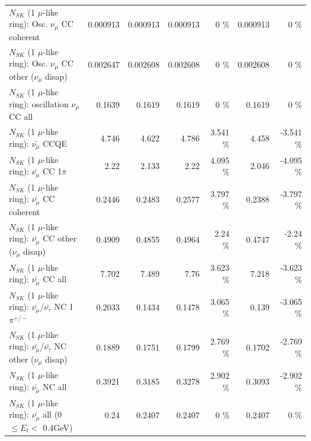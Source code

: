 \begin{table}
\begin{tabular}{| l | r | r | r  r | r  r |}
                        $N_{SK}$ (1 $\mu$-like ring): Osc. $\nu_\mu$ CC coherent &        0.000913 &        0.000913 &        0.000913 &        0 \%  &        0.000913 &        0 \%  \\ 
         $N_{SK}$ (1 $\mu$-like ring): Osc. $\nu_\mu$ CC other ($\nu_\mu$ disap) &        0.002647 &        0.002608 &        0.002608 &        0 \%  &        0.002608 &        0 \%  \\ 
                      $N_{SK}$ (1 $\mu$-like ring): oscillation $\nu_\mu$ CC all &          0.1639 &          0.1619 &          0.1619 &        0 \%  &          0.1619 &        0 \%  \\ 
\hline
\hline
                              $N_{SK}$ (1 $\mu$-like ring): $\bar{\nu_\mu}$ CCQE &           4.746 &           4.622 &           4.786 &    3.541 \%  &           4.458 &   -3.541 \%  \\ 
                         $N_{SK}$ (1 $\mu$-like ring): $\bar{\nu_\mu}$ CC 1$\pi$ &            2.22 &           2.133 &            2.22 &    4.095 \%  &           2.046 &   -4.095 \%  \\ 
                       $N_{SK}$ (1 $\mu$-like ring): $\bar{\nu_\mu}$ CC coherent &          0.2446 &          0.2483 &          0.2577 &    3.797 \%  &          0.2388 &   -3.797 \%  \\ 
        $N_{SK}$ (1 $\mu$-like ring): $\bar{\nu_\mu}$ CC other ($\nu_\mu$ disap) &          0.4909 &          0.4855 &          0.4964 &     2.24 \%  &          0.4747 &    -2.24 \%  \\ 
                          $N_{SK}$ (1 $\mu$-like ring): $\bar{\nu_{\mu}}$ CC all &           7.702 &           7.489 &            7.76 &    3.623 \%  &           7.218 &   -3.623 \%  \\ 
\hline
  $N_{SK}$ (1 $\mu$-like ring): $\bar{\nu_\mu}$/$\bar{\nu_\tau}$ NC 1$\pi^{+/-}$ &          0.2033 &          0.1434 &          0.1478 &    3.065 \%  &           0.139 &   -3.065 \%  \\ 
$N_{SK}$ (1 $\mu$-like ring): $\bar{\nu_\mu}$/$\bar{\nu_\tau}$ NC other ($\nu_\mu$ disap) &          0.1889 &          0.1751 &          0.1799 &    2.769 \%  &          0.1702 &   -2.769 \%  \\ 
                          $N_{SK}$ (1 $\mu$-like ring): $\bar{\nu_{\mu}}$ NC all &          0.3921 &          0.3185 &          0.3278 &    2.902 \%  &          0.3093 &   -2.902 \%  \\ 
\hline
   $N_{SK}$ (1 $\mu$-like ring): $\bar{\nu_{\mu}}$ all (0 $\leq E_{t} <$ 0.4GeV) &            0.24 &          0.2407 &          0.2407 &        0 \%  &          0.2407 &        0 \%  \\ 

\end{tabular}
\end{table}
